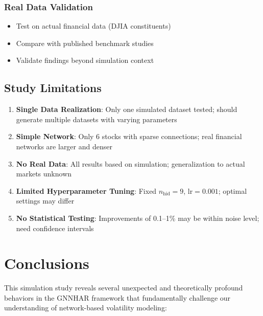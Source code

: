 \documentclass[10pt,a4paper]{article}
\begin{document}
\subsubsection{Real Data Validation}

\begin{itemize}
\item Test on actual financial data (DJIA constituents)
\item Compare with published benchmark studies
\item Validate findings beyond simulation context
\end{itemize}

\subsection{Study Limitations}

\begin{enumerate}
\item \textbf{Single Data Realization}: Only one simulated dataset tested; should generate multiple datasets with varying parameters

\item \textbf{Simple Network}: Only 6 stocks with sparse connections; real financial networks are larger and denser

\item \textbf{No Real Data}: All results based on simulation; generalization to actual markets unknown

\item \textbf{Limited Hyperparameter Tuning}: Fixed $n_{\text{hid}}=9$, $\text{lr}=0.001$; optimal settings may differ

\item \textbf{No Statistical Testing}: Improvements of 0.1--1\% may be within noise level; need confidence intervals
\end{enumerate}

\section{Conclusions}

This simulation study reveals several unexpected and theoretically profound behaviors in the GNNHAR framework that fundamentally challenge our understanding of network-based volatility modeling:
\end{document}
